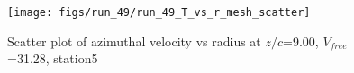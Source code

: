 \begin{figure}[H]
\centering
\texttt{[image: figs/run\_49/run\_49\_T\_vs\_r\_mesh\_scatter]}
\caption{Scatter plot of azimuthal velocity vs radius at $z/c$=9.00, $V_{free}$=31.28, station5}
\label{fig:run_49_T_vs_r_mesh_scatter}
\end{figure}


